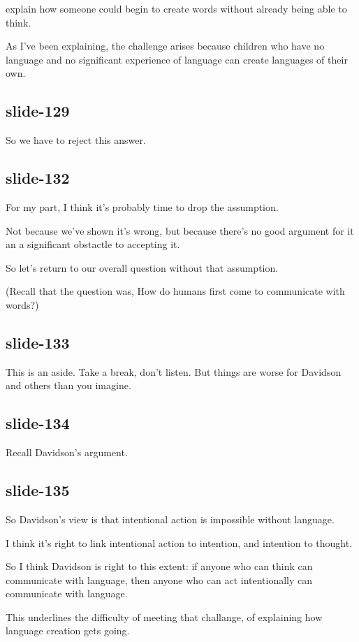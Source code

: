 \documentclass[12pt,\papersize]{extarticle}
\begin{document}
explain how someone could begin to create words without already being able to think.
 
As I've been explaining, the challenge arises because children who have no language and no significant experience of language can create languages of their own.
 
\subsection{slide-129}
So we have to reject this answer.
 
\subsection{slide-132}
For my part, I think it's probably time to drop the assumption.
 
Not because we've shown it's wrong, but because there's no good argument for it an a significant obstactle to accepting it.
 
So let's return to our overall question without that assumption.
 
(Recall that the question was, How do humans first come to communicate with words?)
 
\subsection{slide-133}
This is an aside.  Take a break, don't listen.  But things are worse for Davidson and others than you imagine.
 
\subsection{slide-134}
Recall Davidson's argument.
 
\subsection{slide-135}
So Davidson's view is that intentional action is impossible without language.
 
I think it's right to link intentional action to intention, and intention to thought.
 
So I think Davidson is right to this extent: if anyone who can think can communicate with language, then anyone who can act intentionally can communicate with language.
 
This underlines the difficulty of meeting that challange, of explaining how language creation gets going.
 
\end{document}
